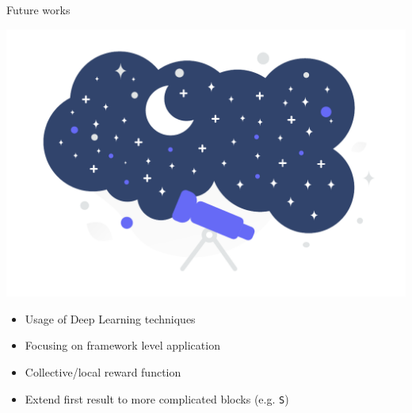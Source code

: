 \begin{frame}{\playfairblack Future works}
  \begin{backgroundblock} 
    \includegraphics[width=\paperwidth]{img/conclusion.pdf} 
  \end{backgroundblock} 
  \begin{card}
    \begin{itemize}  
      \item Usage of Deep Learning techniques
      \item Focusing on framework level application
      \item Collective/local reward function
      \item Extend first result to more complicated blocks (e.g. \texttt{S})
    \end{itemize}
  \end{card}
\end{frame}